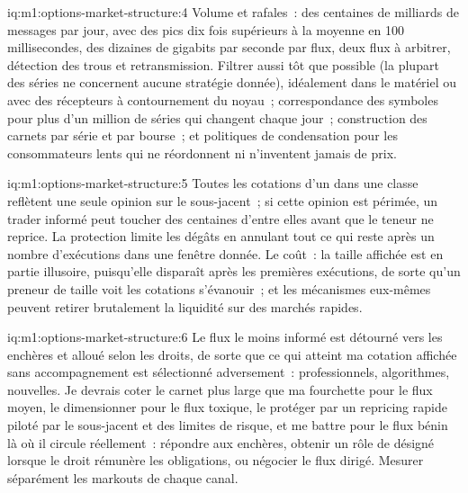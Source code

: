 \begin{solution}{iq:m1:options-market-structure:4}
Volume et rafales~: des centaines de milliards de messages par jour, avec des pics dix fois
supérieurs à la moyenne en 100 millisecondes, des dizaines de gigabits par seconde par flux, deux
flux à arbitrer, détection des trous et retransmission. Filtrer aussi tôt que possible (la plupart
des séries ne concernent aucune stratégie donnée), idéalement dans le matériel ou avec des
récepteurs à contournement du noyau~; correspondance des symboles pour plus d'un
million de séries qui changent chaque jour~; construction des carnets par série et par bourse~;
et politiques de condensation pour les consommateurs lents qui ne réordonnent ni n'inventent
jamais de prix.
\end{solution}

\begin{solution}{iq:m1:options-market-structure:5}
Toutes les cotations d'un  dans une classe reflètent une seule opinion sur le
sous-jacent~; si cette opinion est périmée, un trader informé peut toucher des centaines
d'entre elles avant que le teneur ne reprice. La protection limite les dégâts en annulant tout
ce qui reste après un nombre d'exécutions dans une fenêtre donnée. Le coût~: la taille affichée
est en partie illusoire, puisqu'elle disparaît après les premières exécutions, de sorte
qu'un preneur de taille voit les cotations s'évanouir~; et les mécanismes eux-mêmes peuvent retirer
brutalement la liquidité sur des marchés rapides.
\end{solution}

\begin{solution}{iq:m1:options-market-structure:6}
Le flux le moins informé est détourné vers les enchères et alloué selon les droits, de sorte que
ce qui atteint ma cotation affichée sans accompagnement est sélectionné adversement~: professionnels,
algorithmes, nouvelles. Je devrais coter le carnet plus large que ma fourchette
pour le flux moyen, le dimensionner pour le flux toxique, le protéger par un repricing rapide
piloté par le sous-jacent et des limites de risque, et me battre pour le flux bénin là où il
circule réellement~: répondre aux enchères, obtenir un rôle de  désigné lorsque
le droit rémunère les obligations, ou négocier le flux dirigé.
Mesurer séparément les markouts de chaque canal.
\end{solution}
